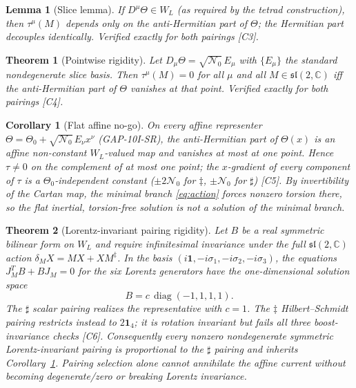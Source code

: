 \documentclass[11pt,a4paper]{article}
\newtheorem{theorem}{Theorem}
\newtheorem{lemma}{Lemma}
\newtheorem{corollary}{Corollary}
\newcommand{\dd}{\ddagger}
\begin{document}
\begin{lemma}[Slice lemma]\label{lem:slice}
If $D^\mu\Theta\in W_L$ (as required by the tetrad construction), then
$\tau^\mu(M)$ depends only on the anti-Hermitian part of $\Theta$; the
Hermitian part decouples identically.  Verified exactly for both pairings
[C3].
\end{lemma}

\begin{theorem}[Pointwise rigidity]\label{thm:rigidity}
Let $D_\mu\Theta=\sqrt{\mathcal N_0}\,E_\mu$ with $\{E_\mu\}$ the standard
nondegenerate slice basis.  Then $\tau^\mu(M)=0$ for all $\mu$ and all
$M\in\mathfrak{sl}(2,\mathbb C)$ iff the anti-Hermitian part of $\Theta$
vanishes at that point.  Verified exactly for both pairings [C4].
\end{theorem}

\begin{corollary}[Flat affine no-go]\label{cor:nogo}
On every affine representer
$\Theta=\Theta_0+\sqrt{\mathcal N_0}\,E_\nu x^\nu$ (GAP-10I-SR), the
anti-Hermitian part of $\Theta(x)$ is an affine non-constant $W_L$-valued
map and vanishes at most at one point.  Hence $\tau\neq0$ on the complement
of at most one point; the $x$-gradient of every component of $\tau$ is a
$\Theta_0$-independent constant ($\pm2\mathcal N_0$ for $\dd$,
$\pm\mathcal N_0$ for $\sharp$) [C5].  By invertibility of the Cartan map,
the minimal branch \eqref{eq:action} forces nonzero torsion there, so the
flat inertial, torsion-free solution is \emph{not} a solution of the
minimal branch.
\end{corollary}

\begin{theorem}[Lorentz-invariant pairing rigidity]\label{thm:pairing}
Let $B$ be a real symmetric bilinear form on $W_L$ and require infinitesimal
invariance under the full $\mathfrak{sl}(2,\mathbb C)$ action
$\delta_M X=MX+XM^{\dd}$.  In the basis
$(i\mathbf1,-i\sigma_1,-i\sigma_2,-i\sigma_3)$, the equations
$J_M^T B+B J_M=0$ for the six Lorentz generators have the one-dimensional
solution space
\[
  B=c\,\operatorname{diag}(-1,1,1,1).
\]
The $\sharp$ scalar pairing realizes the representative with $c=1$.  The
$\ddagger$ Hilbert--Schmidt pairing restricts instead to $2\mathbf1_4$; it is
rotation invariant but fails all three boost-invariance checks [C6].
Consequently every nonzero nondegenerate symmetric Lorentz-invariant pairing
is proportional to the $\sharp$ pairing and inherits Corollary~\ref{cor:nogo}.
Pairing selection alone cannot annihilate the affine current without becoming
degenerate/zero or breaking Lorentz invariance.
\end{theorem}
\end{document}
